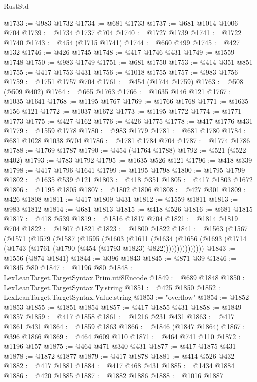 \begin{lexlean}{RustStd}
\begin{coremodule}
@1733 := @983 @1732
@1734 := @681 @1733
@1737 := @681 @1014 @1006 @704
@1739 := @1734 @1737 @704
@1740 := @1727 @1739
@1741 := @1722 @1740
@1743 := @454 (@1715 @1741)
@1744 := @660 @499
@1745 := @427 @132
@1746 := @426 @1745
@1748 := @417 @1746 @431
@1749 := @1559 @1748
@1750 := @983 @1749
@1751 := @681 @1750
@1753 := @414 @351 @851
@1755 := @417 @1753 @431
@1756 := @1018 @1755
@1757 := @983 @1756
@1759 := @1751 @1757 @704
@1761 := @454 (@1744 @1759)
@1763 := @508 (@509 @402)
@1764 := @665 @1763
@1766 := @1635 @146 @121
@1767 := @1035 @1641
@1768 := @1195 @1767
@1769 := @1766 @1768
@1771 := @1635 @156 @121
@1772 := @1037 @1672
@1773 := @1195 @1772
@1774 := @1771 @1773
@1775 := @427 @162
@1776 := @426 @1775
@1778 := @417 @1776 @431
@1779 := @1559 @1778
@1780 := @983 @1779
@1781 := @681 @1780
@1784 := @681 @1028 @1038 @704
@1786 := @1781 @1784 @704
@1787 := @1774 @1786
@1788 := @1769 @1787
@1790 := @454 (@1764 @1788)
@1792 := @521 (@522 @402)
@1793 := @783 @1792
@1795 := @1635 @526 @121
@1796 := @418 @339
@1798 := @417 @1796 @1641
@1799 := @1195 @1798
@1800 := @1795 @1799
@1802 := @1635 @539 @121
@1803 := @418 @351
@1805 := @417 @1803 @1672
@1806 := @1195 @1805
@1807 := @1802 @1806
@1808 := @427 @301
@1809 := @426 @1808
@1811 := @417 @1809 @431
@1812 := @1559 @1811
@1813 := @983 @1812
@1814 := @681 @1813
@1815 := @418 @526
@1816 := @681 @1815
@1817 := @418 @539
@1819 := @1816 @1817 @704
@1821 := @1814 @1819 @704
@1822 := @1807 @1821
@1823 := @1800 @1822
@1841 := @1563
    (@1567
      (@1571
        (@1579
          (@1587
            (@1595
              (@1603
                (@1611
                  (@1634
                    (@1656
                      (@1693 (@1714 (@1743 (@1761 (@1790 (@454 (@1793 @1823) @822)))))))))))))))
@1843 := @1556 (@874 @1841)
@1844 := @396 @1843
@1845 := @871 @39
@1846 := @1845 @80
@1847 := @1196 @80
@1848 := LexLeanTarget.TargetSyntax.Prim.utf8Encode
@1849 := @689 @1848
@1850 := LexLeanTarget.TargetSyntax.Ty.string
@1851 := @425 @1850
@1852 := LexLeanTarget.TargetSyntax.Value.string
@1853 := "overflow"
@1854 := @1852 @1853
@1855 := @1851 @1854
@1857 := @417 @1855 @431
@1858 := @1849 @1857
@1859 := @417 @1858
@1861 := @1216 @231 @431
@1863 := @417 @1861 @431
@1864 := @1859 @1863
@1866 := @1846 (@1847 @1864)
@1867 := @396 @1866
@1869 := @464 @609 @110
@1871 := @464 @741 @110
@1872 := @1196 @157
@1875 := @464 @471 @340 @431
@1877 := @417 @1875 @431
@1878 := @1872 @1877
@1879 := @417 @1878
@1881 := @414 @526 @432
@1882 := @417 @1881
@1884 := @417 @468 @431
@1885 := @1434 @1884
@1886 := @420 @1885
@1887 := @1882 @1886
@1888 := @1016 @1887

\end{coremodule}
\end{lexlean}
